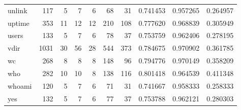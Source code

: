 \begin{tabular}{lrrrrrrrrr}
unlink    &                    117 &                                  5 &                                 7 &                                6 &                                68 &                              31 &                                0.741453 &                               0.957265 &                             0.264957 \\
uptime    &                    353 &                                 11 &                                12 &                               12 &                               210 &                             108 &                                0.777620 &                               0.968839 &                             0.305949 \\
users     &                    133 &                                  5 &                                 7 &                                6 &                                78 &                              37 &                                0.753759 &                               0.962406 &                             0.278195 \\
vdir      &                   1031 &                                 30 &                                56 &                               28 &                               544 &                             373 &                                0.784675 &                               0.970902 &                             0.361785 \\
wc        &                    268 &                                  8 &                                 8 &                                8 &                               148 &                              96 &                                0.794776 &                               0.970149 &                             0.358209 \\
who       &                    282 &                                 10 &                                10 &                                8 &                               138 &                             116 &                                0.801418 &                               0.964539 &                             0.411348 \\
whoami    &                    120 &                                  5 &                                 7 &                                6 &                                71 &                              31 &                                0.741667 &                               0.958333 &                             0.258333 \\
yes       &                    132 &                                  5 &                                 7 &                                6 &                                77 &                              37 &                                0.753788 &                               0.962121 &                             0.280303 \\
\bottomrule
\end{tabular}
